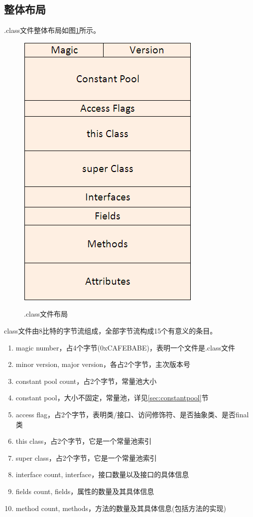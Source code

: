 \documentclass[a4paper,11pt]{article}
\begin{document}
\subsection[整体布局]{整体布局}
.class文件整体布局如图\ref{fig:dotclass}所示。

\begin{figure}
  \centering
  \includegraphics[width=.4\textwidth]{picturedir/JavaClassFileLayout.png}\\
  \caption{.class文件布局}\label{fig:dotclass}
\end{figure}

class文件由8比特的字节流组成，全部字节流构成15个有意义的条目。

\begin{enumerate}
  \item magic number，占4个字节(0xCAFEBABE)，表明一个文件是.class文件
  \item minor version, major version，各占2个字节，主次版本号
  \item constant pool count，占2个字节，常量池大小
  \item constant pool，大小不固定，常量池，详见\ref{sec:constantpool}节
  \item access flag，占2个字节，表明类/接口、访问修饰符、是否抽象类、是否final类
  \item this class，占2个字节，它是一个常量池索引
  \item super class，占2个字节，它是一个常量池索引
  \item interface count, interface，接口数量以及接口的具体信息
  \item fields count, fields，属性的数量及其具体信息
  \item method count, methods，方法的数量及其具体信息(包括方法的实现)
\end{enumerate}
\end{document}
